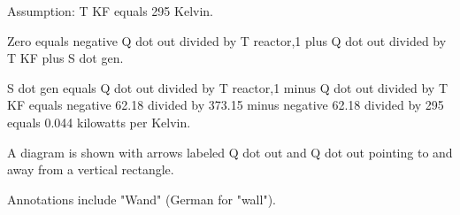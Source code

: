 Assumption: T KF equals 295 Kelvin.  

Zero equals negative Q dot out divided by T reactor,1 plus Q dot out divided by T KF plus S dot gen.  

S dot gen equals Q dot out divided by T reactor,1 minus Q dot out divided by T KF equals negative 62.18 divided by 373.15 minus negative 62.18 divided by 295 equals 0.044 kilowatts per Kelvin.  

A diagram is shown with arrows labeled Q dot out and Q dot out pointing to and away from a vertical rectangle.  

Annotations include "Wand" (German for "wall").